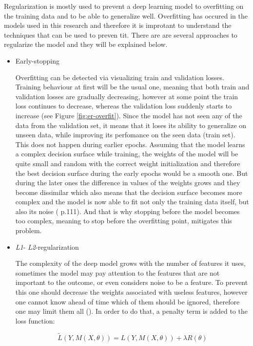 Regularization is mostly used to prevent a deep learning model to overfitting on the training data and to be able to generalize well. Overfitting has occured in the models used in this research and therefore it is improtant to understand the techniques that can be used to preven tit. There are are several approaches to regularize the model and they will be explained below.

\begin{itemize}
	\item Early-stopping

	Overfitting can be detected via visualizing train and validation losses. Training behaviour at first will be the usual one, meaning that both train and validation losses are gradually decreasing, however at some point the train loss continues to decrease, whereas the validation loss suddenly starts to increase (see Figure \ref{fig:er-overfit}). Since the model has not seen any of the data from the validation set, it means that it loses its ability to generalize on unseen data, while improving its perfomance on the seen data (train set). This does not happen during earlier epochs. Assuming that the model learns a complex decision surface while training, the weights of the model will be quite small and random with the correct weight initialization and therefore the best decision surface during the early epochs would be a smooth one. But during the later ones the difference in values of the weights grows and they become dissimilar which also means that the decision surface becomes more complex and the model is now able to fit not only the training data itself, but also its noise (\cite{mitchell_1997} p.111). And that is why stopping before the model becomes too complex, meaning to stop before the overfitting point, mitigates this problem.

	\item \emph{L1}- \emph{L2}-regularization

	The complexity of the deep model grows with the number of features it uses, sometimes the model may pay attention to the features that are not important to the outcome, or even considers noise to be a feature. To prevent this one should decrease the weights associated with useless features, however one cannot know ahead of time which of them should be ignored, therefore one may limit them all (\cite{Ying_2019}). In order to do that, a penalty term is added to the loss function:

	\begin{equation}
	\tilde{L}(Y, M(X, \theta)) = L(Y, M(X, \theta)) + \lambda R(\theta)
	\end{equation}


\end{itemize}
